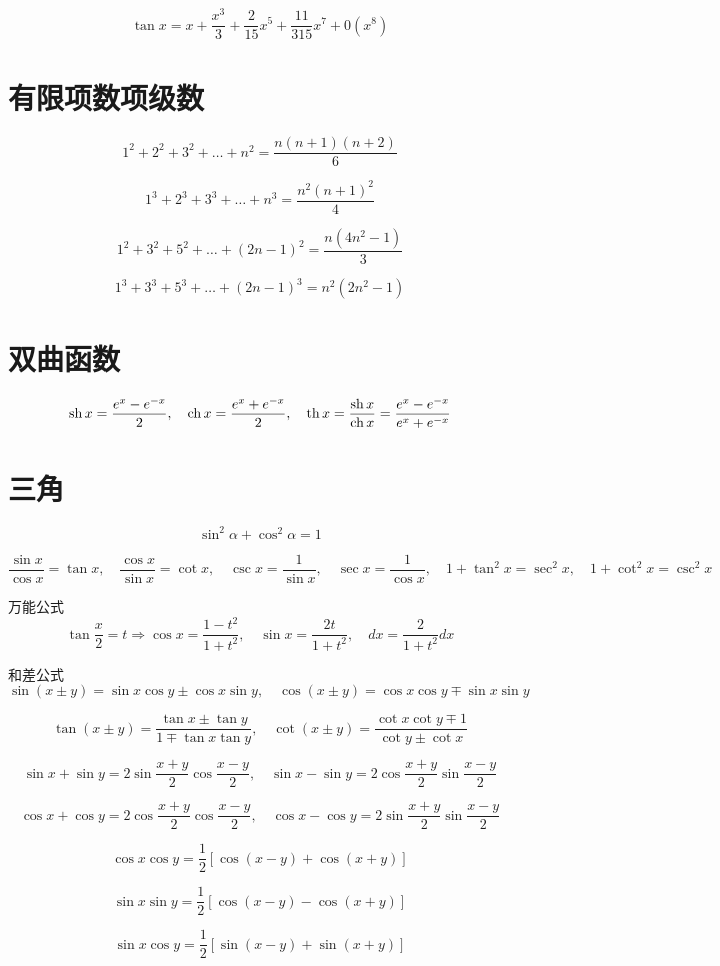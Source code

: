 \documentclass{book}
\begin{document}
$$ \tan x= x+\frac{ x^3}{3}+\frac{2}{15}x^5+\frac{ 11}{315}x^7+0(x^8) $$

\section{有限项数项级数}
$$ 1^2 + 2^2 +3^2+\ldots+n^2=\frac{ n(n+1)(n+2)}{6} $$

$$ 1^3 + 2^3 +3^3+\ldots+n^3=\frac{ n^2(n+1)^2}{4} $$

$$ 1^2+3^2+5^2+\ldots+(2n-1)^2=\frac{n(4n^2-1)}{3} $$

$$ 1^3 + 3^3 +5^3+\ldots+(2n-1)^3=n^2(2n^2-1) $$

\section{双曲函数}
$$ \operatorname{sh} x=\frac{e^x - e^{-x}}{2}, \quad \operatorname{ch} x=\frac{e^x+e^{-x}}{2}, \quad \operatorname{th} x = \frac{ \operatorname{sh} x}{\operatorname{ch} x}=\frac{e^x-e^{-x}}{e^x + e^{-x}} $$

\section{三角}
$$ \sin ^2 \alpha + \cos^2 \alpha=1 $$

$$
\frac{ \sin x}{\cos x}=\tan x, \quad
\frac{ \cos x}{\sin x}=\cot x, \quad
\csc x=\frac{1}{\sin x}, \quad
\sec x=\frac{ 1}{\cos x}, \quad
1+\tan^2 x=\sec^2 x,\quad
1+\cot^2 x=\csc^2 x
$$

万能公式
$$
\tan \frac{x}{2}=t \Rightarrow
\cos x =\frac{ 1-t^2}{1+t^2},\quad
\sin x=\frac{2t}{1+t^2},\quad
dx=\frac{2}{1+t^2}dx
$$

和差公式
$$ \sin(x\pm y)=\sin x \cos y \pm \cos x \sin y,\quad \cos(x \pm y)=\cos x \cos y \mp \sin x \sin y $$

$$
\tan(x \pm y)=\frac{\tan x \pm \tan y}{1 \mp \tan x \tan y}, \quad
\cot (x\pm y)=\frac{\cot x \cot y \mp 1}{\cot y \pm \cot x}
$$

$$
\sin x+\sin y=2\sin \frac{x+y}{2} \cos \frac{ x -y }{2}, \quad
\sin x-\sin y=2\cos \frac{x+y}{2} \sin \frac{ x -y }{2}
$$

$$
\cos x+\cos y=2\cos \frac{x+y}{2} \cos \frac{ x -y }{2}, \quad
\cos x-\cos y=2\sin \frac{x+y}{2} \sin \frac{ x -y }{2}
$$

$$ \cos x \cos y=\frac{ 1}{2}[\cos(x-y)+\cos(x+y)] $$

$$ \sin x \sin y=\frac{ 1}{2}[\cos(x-y)-\cos(x+y)] $$

$$ \sin x \cos y=\frac{ 1}{2}[\sin(x-y)+\sin(x+y)] $$
\end{document}
